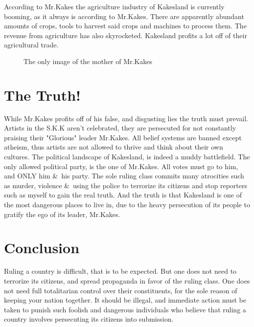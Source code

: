 \documentclass[fleqn]{article}
\newcommand{\3}{\vspace*{3mm}}
\newcommand{\Kakes}{S.K.K \hspace*{.15mm}}
\begin{document}
\3

According to Mr.Kakes the agriculture industry of Kakesland is currently booming, as it always is according to Mr.Kakes. There are apparently abundant amounts of crops, tools to harvest said crops and machines to process them. The revenue from agriculture has also skyrocketed. Kakesland profits a lot off of their agricultural trade. 

\newpage

 \begin{figure}[!hbt]
 \begin{center}
 \begin{minipage}{0.85\textwidth}
 \caption{\label{MEME}\small{The only image of the mother of Mr.Kakes }}
 \end{minipage}
 \end{center}
 \end{figure}

\section*{The Truth!}

While Mr.Kakes profits off of his false, and disgusting lies the truth must prevail. Artists in the \Kakes aren't celebrated, they are persecuted for not constantly praising their "Glorious" leader Mr.Kakes. All belief systems are banned except atheism, thus artists are not allowed to thrive and think about their own cultures. The political landscape of Kakesland, is indeed a muddy battlefield. The only allowed political party, is the one of Mr.Kakes. All votes must go to him, and ONLY him \&\ his party. The sole ruling class commits many atrocities such as murder, violence \&\ using the police to terrorize its citizens and stop reporters such as myself to gain the real truth. And the truth is that Kakesland is one of the most dangerous places to live in, due to the heavy persecution of its people to gratify the ego of its leader, Mr.Kakes. 

\section*{Conclusion}

\3

Ruling a country is difficult, that is to be expected. But one does not need to terrorize its citizens, and spread propaganda in favor of the ruling class. One does not need full totalitarian control over their constituents, for the sole reason of keeping your nation together. It should be illegal, and immediate action must be taken to punish such foolish and dangerous individuals who believe that ruling a country involves persecuting its citizens into submission. 
\end{document}
